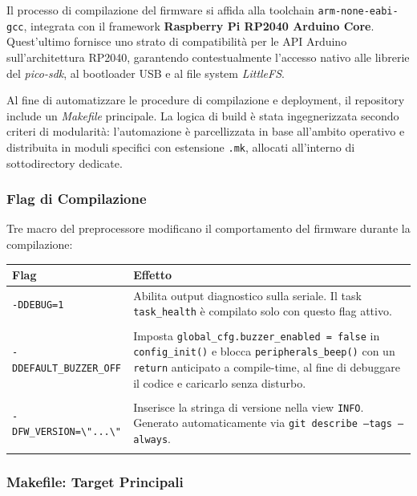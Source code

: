 Il processo di compilazione del firmware si affida alla toolchain \texttt{arm-none-eabi-gcc}, integrata con il framework \textbf{Raspberry Pi RP2040 Arduino Core}. Quest'ultimo fornisce uno strato di compatibilità per le API Arduino sull'architettura RP2040, garantendo contestualmente l'accesso nativo alle librerie del \textit{pico-sdk}, al bootloader USB e al file system \textit{LittleFS}.

Al fine di automatizzare le procedure di compilazione e deployment, il repository include un \textit{Makefile} principale. La logica di build è stata ingegnerizzata secondo criteri di modularità: l'automazione è parcellizzata in base all'ambito operativo e distribuita in moduli specifici con estensione \texttt{.mk}, allocati all'interno di sottodirectory dedicate.


\subsubsection*{Flag di Compilazione}

Tre macro del preprocessore modificano il comportamento del firmware durante la compilazione:

\begin{tabularx}{\textwidth}{@{}l X@{}}
	\toprule
	\textbf{Flag} & \textbf{Effetto} \\
	\midrule
	\texttt{-DDEBUG=1} & Abilita output diagnostico sulla seriale. Il task \texttt{task\_health} è compilato solo con questo
	flag attivo. \\ \\[4pt]
	\texttt{-DDEFAULT\_BUZZER\_OFF} & Imposta \texttt{global\_cfg.buzzer\_enabled = false} in \texttt{config\_init()} e blocca \texttt{peripherals\_beep()} con un \texttt{return} anticipato a compile-time, al fine di debuggare il codice e caricarlo senza disturbo.\\ \\[4pt]
	\texttt{-DFW\_VERSION=\textbackslash"...\textbackslash"} & Inserisce la stringa di versione nella view \texttt{INFO}. Generato automaticamente via \texttt{git describe --tags --always}. \\ \\
	\bottomrule
\end{tabularx}

\subsubsection*{Makefile: Target Principali}


